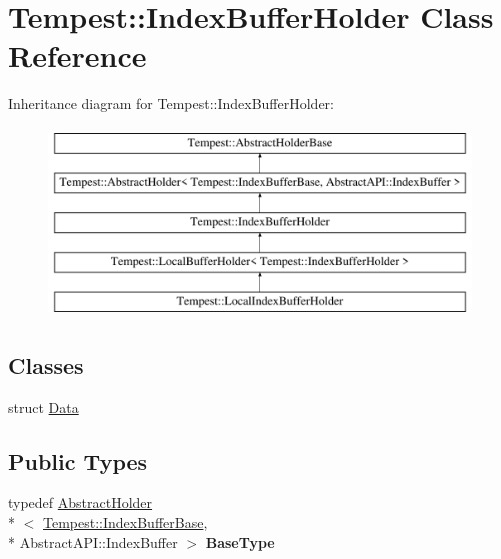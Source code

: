 \hypertarget{class_tempest_1_1_index_buffer_holder}{\section{Tempest\+:\+:Index\+Buffer\+Holder Class Reference}
\label{class_tempest_1_1_index_buffer_holder}
}
Inheritance diagram for Tempest\+:\+:Index\+Buffer\+Holder\+:\begin{figure}[H]
\begin{center}
\leavevmode
\includegraphics[height=5.000000cm]{class_tempest_1_1_index_buffer_holder}
\end{center}
\end{figure}
\subsection*{Classes}
\begin{DoxyCompactItemize}
\item 
struct \hyperlink{struct_index_buffer_holder_1_1_data}{Data}
\end{DoxyCompactItemize}
\subsection*{Public Types}
\begin{DoxyCompactItemize}
\item 
\hypertarget{class_tempest_1_1_index_buffer_holder_aa191f80192940101f77630e0b8e2272d}{typedef \hyperlink{class_tempest_1_1_abstract_holder}{Abstract\+Holder}\\*
$<$ \hyperlink{class_tempest_1_1_index_buffer_base}{Tempest\+::\+Index\+Buffer\+Base}, \\*
Abstract\+A\+P\+I\+::\+Index\+Buffer $>$ {\bfseries Base\+Type}}\label{class_tempest_1_1_index_buffer_holder_aa191f80192940101f77630e0b8e2272d}

\end{DoxyCompactItemize}
